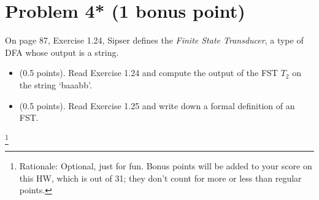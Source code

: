\documentclass[letterpaper,11pt,twoside]{article}
\theoremstyle{plain}
\theoremstyle{definition}
\theoremstyle{remark}
\theoremstyle{restate}
\newcommand\blfootnote[1]{%
  \begingroup
  \renewcommand\thefootnote{}\footnote{#1}%
  \addtocounter{footnote}{-1}%
  \endgroup
}
\begin{document}
\clearpage
\section*{Problem 4* (1 bonus point)}

On page 87, Exercise 1.24, Sipser defines the \emph{Finite State Transducer}, a type of DFA whose output is a string.

\begin{itemize}
    \item (0.5 points). Read Exercise 1.24 and compute the output of the FST $T_2$ on the string `baaabb'.

    \item (0.5 points). Read Exercise 1.25 and write down a formal definition of an FST.

\end{itemize}

    \blfootnote{ Rationale: Optional, just for fun. Bonus points will be added to your score on this HW, which is out of 31; they don't count for more or less than regular points. }
\end{document}
